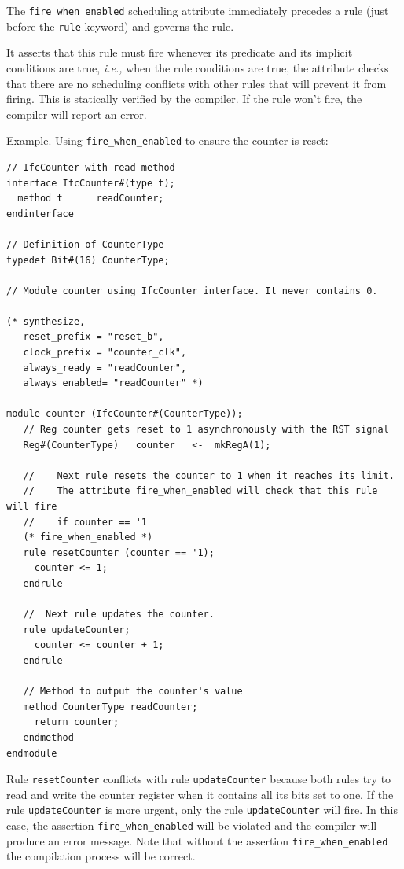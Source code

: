 \documentclass[twoside,letterpaper]{article}
\newcommand{\ie}{\emph{i.e.,}}
\newcommand{\te}[1]{\texttt{#1}}
\begin{document}
The \te{fire\_when\_enabled} scheduling attribute immediately precedes
a rule (just before the \te{rule} keyword) and governs the rule.

It asserts that this rule must fire whenever its predicate and its
implicit conditions are true, {\ie} when the rule conditions are true,
the attribute checks
that there are no
scheduling conflicts with other rules that will prevent it from
firing.  This is statically verified by the compiler.  If the rule
won't fire, the compiler will report an error.  

Example.  Using \te{fire\_when\_enabled} to ensure the counter is
reset:
\begin{verbatim}
// IfcCounter with read method
interface IfcCounter#(type t);
  method t      readCounter;
endinterface

// Definition of CounterType
typedef Bit#(16) CounterType;

// Module counter using IfcCounter interface. It never contains 0.

(* synthesize,
   reset_prefix	= "reset_b",
   clock_prefix	= "counter_clk",
   always_ready	= "readCounter",
   always_enabled= "readCounter" *)

module counter (IfcCounter#(CounterType));
   // Reg counter gets reset to 1 asynchronously with the RST signal         
   Reg#(CounterType)   counter   <-  mkRegA(1);

   //    Next rule resets the counter to 1 when it reaches its limit.
   //    The attribute fire_when_enabled will check that this rule will fire
   //    if counter == '1                                                    
   (* fire_when_enabled *)
   rule resetCounter (counter == '1);
     counter <= 1;
   endrule

   //  Next rule updates the counter.
   rule updateCounter;
     counter <= counter + 1;
   endrule

   // Method to output the counter's value
   method CounterType readCounter;
     return counter;
   endmethod  
endmodule
\end{verbatim}
Rule \te{resetCounter} conflicts with rule \te{updateCounter} because
both  rules try to read and write the counter register when it contains all its bits
set to  one. If the rule \te{updateCounter} is  more
urgent, 
only the  rule \te{updateCounter} will fire.  In this case, the
assertion  \te{fire\_when\_enabled} will be violated and the compiler
will  produce an error message.  Note that without the assertion
\te{fire\_when\_enabled} the compilation  process will be correct.
\end{document}
